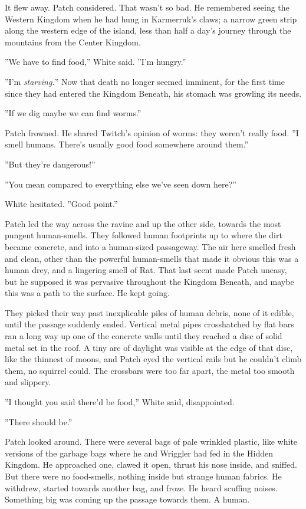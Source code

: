 \documentclass[12pt]{book}
\begin{document}
 It flew away. Patch considered. That wasn't so bad. He remembered seeing the Western Kingdom when he had hung in Karmerruk's claws; a narrow green strip along the western edge of the island, less than half a day's journey through the mountains from the Center Kingdom.\par
 ''We have to find food,'' White said. ''I'm hungry.''\par
 ''I'm {\it starving.}'' Now that death no longer seemed imminent, for the first time since they had entered the Kingdom Beneath, his stomach was growling its needs.\par
 ''If we dig maybe we can find worms.''\par
 Patch frowned. He shared Twitch's opinion of worms: they weren't really food. ''I smell humans. There's usually good food somewhere around them.''\par
 ''But they're dangerous!''\par
 ''You mean compared to everything else we've seen down here?''\par
 White hesitated. ''Good point.''\par
 Patch led the way across the ravine and up the other side, towards the most pungent human-smells. They followed human footprints up to where the dirt became concrete, and into a human-sized passageway. The air here smelled fresh and clean, other than the powerful human-smells that made it obvious this was a human drey, and a lingering smell of Rat. That last scent made Patch uneasy, but he supposed it was pervasive throughout the Kingdom Beneath, and maybe this was a path to the surface. He kept going.\par
 They picked their way past inexplicable piles of human debris, none of it edible, until the passage suddenly ended. Vertical metal pipes crosshatched by flat bars ran a long way up one of the concrete walls until they reached a disc of solid metal set in the roof. A tiny arc of daylight was visible at the edge of that disc, like the thinnest of moons, and Patch eyed the vertical rails %
 but he couldn't climb them, no squirrel could. The crossbars were too far apart, the metal too smooth and slippery.\par
 ''I thought you said there'd be food,'' White said, disappointed.\par
 ''There should be.''\par
 Patch looked around. There were several bags of pale wrinkled plastic, like white versions of the garbage bags where he and Wriggler had fed in the Hidden Kingdom. He approached one, clawed it open, thrust his nose inside, and sniffed. But there were no food-smells, nothing inside but strange human fabrics. He withdrew, started towards another bag, and froze. He heard scuffing noises. Something big was coming up the passage towards them. A human.\par
\end{document}

